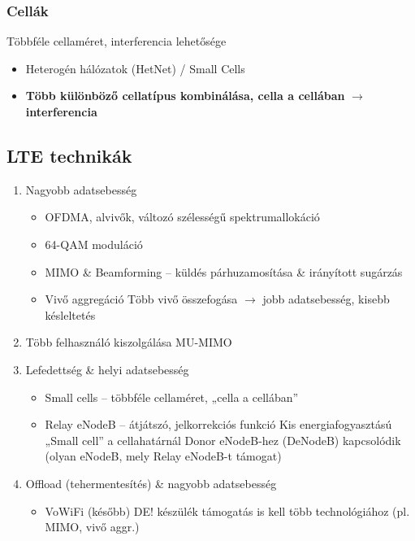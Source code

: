 \documentclass[10pt,a4paper]{article}
\begin{document}
\subsubsection{Cellák}
Többféle cellaméret, interferencia lehetősége
	\begin{itemize}
		\item Heterogén hálózatok (HetNet) / Small Cells
		\item \textbf{Több különböző cellatípus kombinálása, cella a cellában} $\rightarrow$ \textbf{interferencia}
	\end{itemize}
\subsection{LTE technikák}
\begin{enumerate}
	\item Nagyobb adatsebesség
		\begin{itemize}
		\item  OFDMA, alvivők, változó szélességű spektrumallokáció
		\item  64-QAM moduláció
		\item  MIMO \& Beamforming -- küldés párhuzamosítása \& irányított sugárzás
		\item  Vivő aggregáció
		\subitem Több vivő összefogása $\rightarrow$ jobb adatsebesség, kisebb késleltetés
		\end{itemize}
	\item Több felhasználó kiszolgálása
	\subitem  MU-MIMO
	\item Lefedettség \& helyi adatsebesség
		\begin{itemize}
		\item  Small cells – többféle cellaméret, „cella a cellában”
		\item  Relay eNodeB – átjátszó, jelkorrekciós funkció
		\subitem Kis energiafogyasztású „Small cell” a cellahatárnál
		\subitem Donor eNodeB-hez (DeNodeB) kapcsolódik (olyan eNodeB, mely Relay eNodeB-t támogat)
		\end{itemize}
	\item 	Offload (tehermentesítés) \& nagyobb adatsebesség
		\begin{itemize}
		\item  VoWiFi (később)
		\subitem DE! készülék támogatás is kell több technológiához (pl. MIMO, vivő aggr.)
		\end{itemize}
\end{enumerate}
\end{document}
